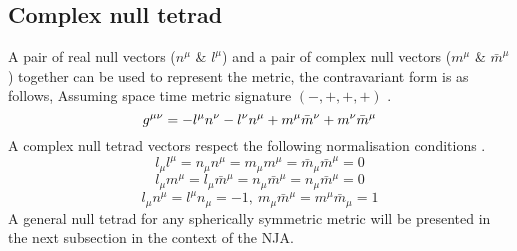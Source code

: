 \documentclass[12pt]{iopart}
\begin{document}
\subsection{Complex null tetrad}
A pair of real null vectors ($n^{\mu}$ \& $l^{\mu}$) and a pair of complex null vectors ($m^{\mu}$ \& $\bar{m}^{\mu}$) together can be used to represent the metric, the contravariant form is as follows, Assuming space time metric signature $(-,+,+,+)$ \cite{dInverno:1992gxs}. 
\begin{equation}
g^{\mu \nu}=-l^{\mu}n^{\nu}-l^{\nu}n^{\mu}+m^{\mu}\Bar{m}^{\nu}+m^{\nu}\Bar{m}^{\mu}
\end{equation}
A complex null tetrad vectors respect the following normalisation conditions \cite{dInverno:1992gxs}.
\begin{equation} 
l_{\mu}l^{\mu}=n_{\mu}n^{\mu}=m_{\mu}m^{\mu}=\bar{m}_{\mu}\bar{m}^{\mu}=0
\end{equation}
\begin{equation} 
l_{\mu}m^{\mu}=l_{\mu}\bar{m}^{\mu}=n_{\mu}\bar{m}^{\mu}=n_{\mu}\bar{m}^{\mu}=0
\end{equation}
\begin{equation} 
l_{\mu}n^{\mu}=l^{\mu}n_{\mu} =-1,\ m_{\mu}\bar{m}^{\mu}=m^{\mu}\bar{m}_{\mu}=1
\end{equation}
A general null tetrad for any spherically symmetric metric will be presented in the next subsection in the context of the NJA.
\\
\\
\end{document}

